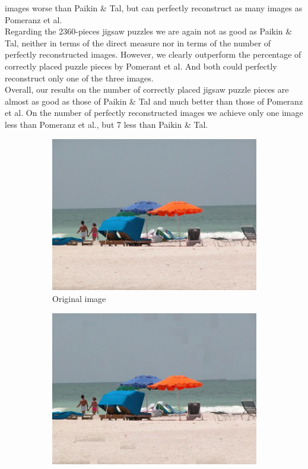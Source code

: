 \documentclass[11pt]{report}
\begin{document}
images worse than Paikin \& Tal, but can perfectly reconstruct as many images as
Pomeranz et al. \\
Regarding the 2360-pieces jigsaw puzzles we are again not as good as Paikin \&
Tal, neither in terms of the direct measure nor in terms of the number of
perfectly reconstructed images. However, we clearly outperform the percentage of
correctly placed puzzle pieces by Pomerant et al. And both could perfectly
reconstruct only one of the three images. \\
Overall, our results on the number of correctly placed jigsaw puzzle pieces are
almost as good as those of Paikin \& Tal and much better than those of Pomeranz
et al. On the number of perfectly reconstructed images we achieve only one image
less than Pomeranz et al., but 7 less than Paikin \& Tal.
\begin{figure}
  \centering
  \begin{subfigure}{0.45\textwidth}
    \includegraphics[width=\textwidth]{../imData/540/8.jpg}
		\caption{Original image}
		\label{img:540_8}
	\end{subfigure}
  \begin{subfigure}{0.45\textwidth}
  \includegraphics[width=\textwidth]{8_solved.png}

\end{subfigure}
\end{figure}
\end{document}
